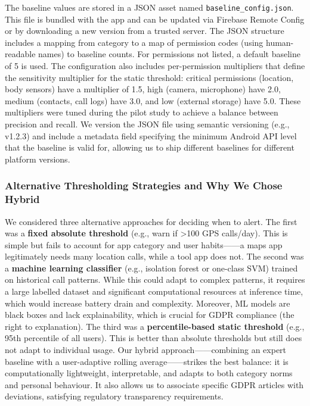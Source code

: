 The baseline values are stored in a JSON asset named \texttt{baseline\_config.json}. This file is bundled with the app and can be updated via Firebase Remote Config or by downloading a new version from a trusted server. The JSON structure includes a mapping from category to a map of permission codes (using human-readable names) to baseline counts. For permissions not listed, a default baseline of 5 is used. The configuration also includes per-permission multipliers that define the sensitivity multiplier for the static threshold: critical permissions (location, body sensors) have a multiplier of 1.5, high (camera, microphone) have 2.0, medium (contacts, call logs) have 3.0, and low (external storage) have 5.0. These multipliers were tuned during the pilot study to achieve a balance between precision and recall. We version the JSON file using semantic versioning (e.g., v1.2.3) and include a metadata field specifying the minimum Android API level that the baseline is valid for, allowing us to ship different baselines for different platform versions.

\subsubsection{Alternative Thresholding Strategies and Why We Chose Hybrid}

We considered three alternative approaches for deciding when to alert. The first was a \textbf{fixed absolute threshold} (e.g., warn if >100 GPS calls/day). This is simple but fails to account for app category and user habits——a maps app legitimately needs many location calls, while a tool app does not. The second was a \textbf{machine learning classifier} (e.g., isolation forest or one-class SVM) trained on historical call patterns. While this could adapt to complex patterns, it requires a large labelled dataset and significant computational resources at inference time, which would increase battery drain and complexity. Moreover, ML models are black boxes and lack explainability, which is crucial for GDPR compliance (the right to explanation). The third was a \textbf{percentile-based static threshold} (e.g., 95th percentile of all users). This is better than absolute thresholds but still does not adapt to individual usage. Our hybrid approach——combining an expert baseline with a user-adaptive rolling average——strikes the best balance: it is computationally lightweight, interpretable, and adapts to both category norms and personal behaviour. It also allows us to associate specific GDPR articles with deviations, satisfying regulatory transparency requirements.

